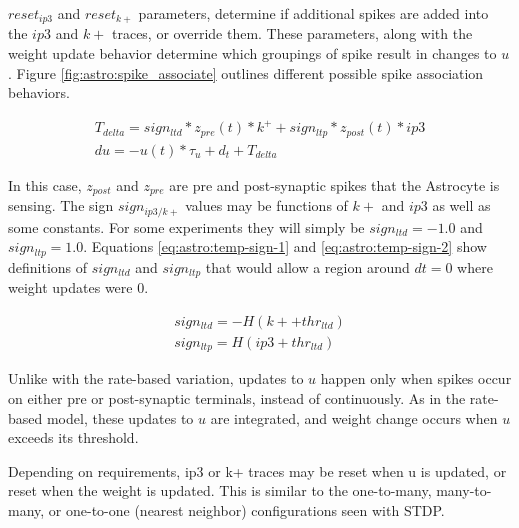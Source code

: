     $reset_{ip3}$ and $reset_{k+}$ parameters, determine if additional spikes
    are added into the $ip3$ and $k+$ traces, or override them. These
    parameters, along with the weight update behavior determine which groupings
    of spike result in changes to $u$. Figure \ref{fig:astro:spike_associate}
    outlines different possible spike association behaviors.


    \begin{align}
      T_{delta} = sign_{ltd} * z_{pre}(t) * k^+ + sign_{ltp} * z_{post}(t) * ip3 \\
      du = -u(t) * \tau_u + d_t + T_{delta} \label{eq:astro:temp-u}
    \end{align}

    In this case, $z_{post}$ and $z_{pre}$ are pre and post-synaptic spikes that
    the Astrocyte is sensing. The sign $sign_{ip3/k+}$ values may be functions
    of $k+$ and $ip3$ as well as some constants. For some experiments they will
    simply be $sign_{ltd}=-1.0$ and $sign_{ltp}=1.0$. Equations
    \ref{eq:astro:temp-sign-1} and \ref{eq:astro:temp-sign-2} show definitions
    of $sign_{ltd}$ and $sign_{ltp}$ that would allow a region around $dt=0$
    where weight updates were 0.

    \begin{align}
      sign_{ltd} = -H(k+ + thr_{ltd}) \label{eq:astro:temp-sign-1}\\
      sign_{ltp} = H(ip3 + thr_{ltd}) \label{eq:astro:temp-sign-2}
    \end{align}

    Unlike with the rate-based variation, updates to $u$ happen only when spikes
    occur on either pre or post-synaptic terminals, instead of continuously. As
    in the rate-based model, these updates to $u$ are integrated, and weight
    change occurs when $u$ exceeds its threshold.

    Depending on requirements, ip3 or k+ traces may be reset when u is updated,
    or reset when the weight is updated. This is similar to the one-to-many,
    many-to-many, or one-to-one (nearest neighbor) configurations seen with
    STDP.

